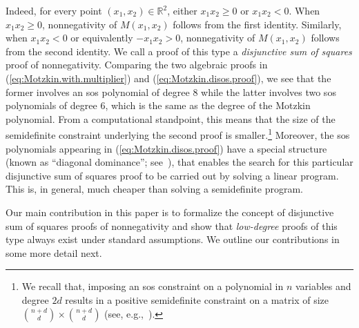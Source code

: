 \documentclass[12pt]{article}
\newcommand{\reals}{\mathbb{R}}
\theoremstyle{remark}
\begin{document}
Indeed, for every point $(x_1,x_2)\in\reals^2$, either $x_1x_2\ge 0$ or $x_1x_2<0$. When $x_1x_2\ge 0$, nonnegativity of $M(x_1,x_2)$ follows from the first identity. Similarly, when $x_1x_2<0$ or equivalently $-x_1x_2>0$, nonnegativity of $M(x_1,x_2)$ follows from the second identity. We call a proof of this type a \emph{disjunctive sum of squares} proof of nonnegativity. Comparing the two algebraic proofs in (\ref{eq:Motzkin.with.multiplier}) and (\ref{eq:Motzkin.disos.proof}), we see that the former involves an sos polynomial of degree 8 while the latter involves two sos polynomials of degree 6, which is the same as the degree of the Motzkin polynomial. From a computational standpoint, this means that the size of the semidefinite constraint underlying the second proof is smaller.\footnote{We recall that, imposing an sos constraint on a polynomial in $n$ variables and degree $2d$ results in a positive semidefinite constraint on a matrix of size ${{n+d}\choose{d}}\times {{n+d}\choose{d}}$ (see, e.g.,~\cite{Parrilo2000, parrilo2003semidefinite}).}
Moreover, the sos polynomials appearing in (\ref{eq:Motzkin.disos.proof}) have a special structure (known as ``diagonal dominance''; see~\cite{aaa2018dsos}), that enables the search for this particular disjunctive sum of squares proof to be carried out by solving a linear program. This is, in general, much cheaper than solving a semidefinite program.



Our main contribution in this paper is to formalize the concept of disjunctive sum of squares proofs of nonnegativity and show that \emph{low-degree} proofs of this type always exist under standard assumptions. We outline our contributions in some more detail next.



\end{document}
